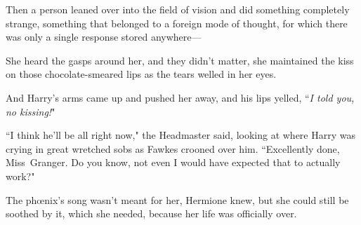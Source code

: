 Then a person leaned over into the field of vision and did something completely strange, something that belonged to a foreign mode of thought, for which there was only a single response stored anywhere—

\later

She heard the gasps around her, and they didn't matter, she maintained the kiss on those chocolate-smeared lips as the tears welled in her eyes.

And Harry's arms came up and pushed her away, and his lips yelled, ``\emph{I told you, no kissing!}"

\later

``I think he'll be all right now," the Headmaster said, looking at where Harry was crying in great wretched sobs as Fawkes crooned over him. ``Excellently done, Miss~Granger. Do you know, not even I would have expected that to actually work?"

The phœnix's song wasn't meant for her, Hermione knew, but she could still be soothed by it, which she needed, because her life was officially over.

